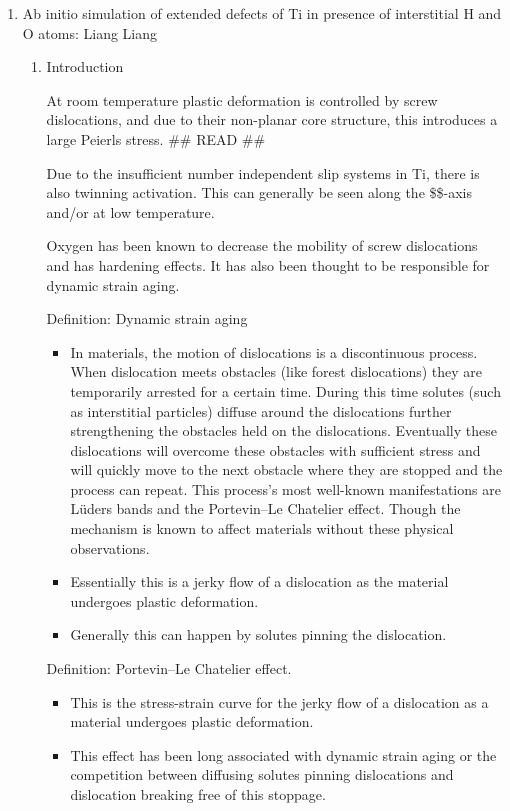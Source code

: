 \documentclass[11pt]{article}
\begin{document}
\begin{enumerate}
\item Ab initio simulation of extended defects of Ti in presence of interstitial H and O atoms: Liang Liang
\label{sec:org344f947}
\cite{liang:tel-01355132}

\begin{enumerate}
\item Introduction
\label{sec:org49b660c}

At room temperature plastic deformation is controlled by screw dislocations, and due to their 
non-planar core structure, this introduces a large Peierls stress. \cite{Biget1989} \#\# READ \#\#

Due to the insufficient number independent slip systems in Ti, there is also twinning activation. 
This can generally be seen along the \$\$-axis and/or at low temperature. 

Oxygen has been known to decrease the mobility of screw dislocations and has hardening effects. 
It has also been thought to be responsible for dynamic strain aging. 

Definition: Dynamic strain aging
\begin{itemize}
\item In materials, the motion of dislocations is a discontinuous process. When dislocation meets obstacles 
(like forest dislocations) they are temporarily arrested for a certain time. During this time solutes 
(such as interstitial particles) diffuse around the dislocations further strengthening the obstacles
 held on the dislocations. Eventually these dislocations will overcome these obstacles with sufficient 
stress and will quickly move to the next obstacle where they are stopped and the process can repeat. 
This process's most well-known manifestations are Lüders bands and the Portevin–Le Chatelier effect. 
Though the mechanism is known to affect materials without these physical observations.
\item Essentially this is a jerky flow of a dislocation as the material undergoes plastic deformation.
\item Generally this can happen by solutes pinning the dislocation.
\end{itemize}

Definition: Portevin–Le Chatelier effect. 
\begin{itemize}
\item This is the stress-strain curve for the jerky flow of a dislocation as a material undergoes plastic deformation.
\item This effect has been long associated with dynamic strain aging or the competition between diffusing solutes
pinning dislocations and dislocation breaking free of this stoppage.
\end{itemize}


\end{enumerate}
\end{enumerate}
\end{document}
